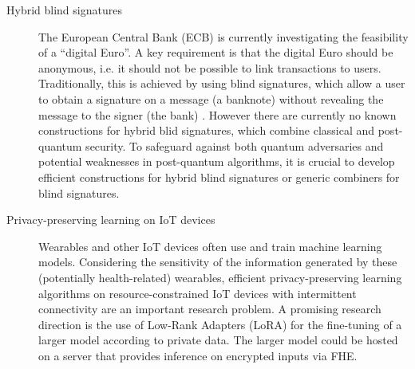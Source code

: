 \documentclass{article}
\begin{document}
\begin{description}
    \item[Hybrid blind signatures] The European Central Bank (ECB) is currently investigating the feasibility of a ``digital Euro''. A key requirement is that the digital Euro should be anonymous, i.e. it should not be possible to link transactions to users. Traditionally, this is achieved by using blind signatures, which allow a user to obtain a signature on a message (a banknote) without revealing the message to the signer (the bank) \cite{Chaum82}. However there are currently no known constructions for hybrid blid signatures, which combine classical and post-quantum security. To safeguard against both quantum adversaries and potential weaknesses in post-quantum algorithms,  it is crucial to develop efficient constructions for hybrid blind signatures or generic combiners for blind signatures.
    \item[Privacy-preserving learning on IoT devices] Wearables and other IoT devices often use and train machine learning models. 
    Considering the sensitivity of the information generated by these (potentially health-related) wearables, efficient privacy-preserving learning algorithms on resource-constrained IoT devices with intermittent connectivity are an important research problem.
    A promising research direction is the use of Low-Rank Adapters (LoRA) for the fine-tuning of a larger model according to private data. 
    The larger model could be hosted on a server that provides inference on encrypted inputs via FHE.
\end{description}


\end{document}
